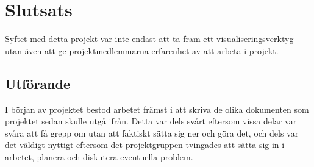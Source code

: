 \documentclass[a4paper,12pt]{article}
\begin{document}
\section{Slutsats}
\label{ch:slutsats}
Syftet med detta projekt var inte endast att ta fram ett visualiseringsverktyg utan även att ge projektmedlemmarna erfarenhet av att arbeta i projekt. 

\subsection{Utförande}
I början av projektet bestod arbetet främst i att skriva de olika dokumenten som projektet sedan skulle utgå ifrån. Detta var dels svårt eftersom vissa delar var svåra att få grepp om utan att faktiskt sätta sig ner och göra det, och dels var det väldigt nyttigt eftersom det projektgruppen tvingades att sätta sig in i arbetet, planera och diskutera eventuella problem. 




\newpage
{}
\printbibliography{}
\end{document}
